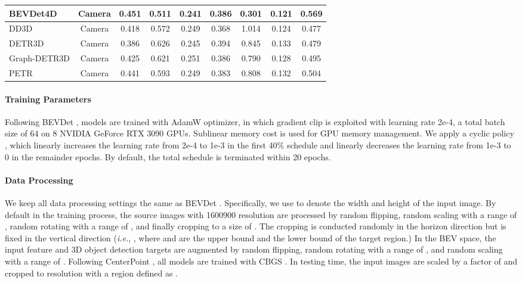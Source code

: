 \documentclass[10pt,twocolumn,letterpaper]{article}
\begin{document}
\begin{table*}[t]
{\begin{tabular}{l|c|ccccccc}
    \textbf{BEVDet4D}            & Camera   & \textbf{0.451}& \textbf{0.511}     & 0.241             & \textbf{0.386}    & \textbf{0.301}    & \textbf{0.121}    & \textbf{0.569}\\
    \hline
    DD3D \cite{DD3D}       & Camera   & 0.418         & 0.572              & 0.249             & 0.368             & 1.014             & 0.124             & 0.477          \\
    DETR3D \cite{DETR3D}   & Camera   & 0.386         & 0.626              & 0.245             & 0.394             & 0.845             & 0.133             & 0.479          \\
    Graph-DETR3D \cite{Graph-DETR3D}& Camera   & 0.425         & 0.621     & 0.251             & 0.386             & 0.790             & 0.128             & 0.495          \\
    PETR \cite{PETR}       & Camera   & 0.441         & 0.593              & 0.249             & 0.383             & 0.808             & 0.132             & 0.504          \\
    \hline

    \hline
    \end{tabular}}
  \label{tab:nus-test}\end{table*}

\paragraph{Training Parameters}
Following BEVDet \cite{BEVDet}, models are trained with AdamW \cite{AdamW} optimizer, in which gradient clip is exploited with learning rate 2e-4, a total batch size of 64 on 8 NVIDIA GeForce RTX 3090 GPUs. Sublinear memory cost \cite{SMC} is used for GPU memory management. We apply a cyclic policy \cite{Second}, which linearly increases the learning rate from 2e-4 to 1e-3 in the first 40\% schedule and linearly decreases the learning rate from 1e-3 to 0 in the remainder epochs. By default, the total schedule is terminated within 20 epochs.

\paragraph{Data Processing} We keep all data processing settings the same as BEVDet \cite{BEVDet}. Specifically, we use  to denote the width and height of the input image. By default in the training process, the source images with 1600900 resolution \cite{NS} are processed by random flipping, random scaling with a range of , random rotating with a range of , and finally cropping to a size of . The cropping is conducted randomly in the horizon direction but is fixed in the vertical direction (\textit{i.e.}, , where  and  are the upper bound and the lower bound of the target region.) In the BEV space, the input feature and 3D object detection targets are augmented by random flipping, random rotating with a range of , and random scaling with a range of . Following CenterPoint \cite{CenterPoint3D}, all models are trained with CBGS \cite{CBGS}. In testing time, the input images are scaled by a factor of  and cropped to  resolution with a region defined as .
\end{document}
